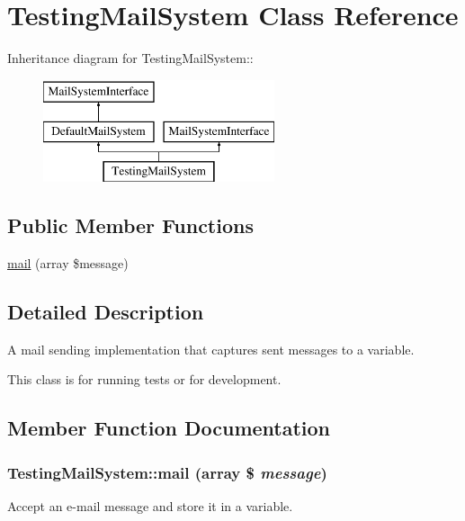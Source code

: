 \hypertarget{classTestingMailSystem}{
\section{TestingMailSystem Class Reference}
\label{classTestingMailSystem}
}
Inheritance diagram for TestingMailSystem::\begin{figure}[H]
\begin{center}
\leavevmode
\includegraphics[height=3cm]{classTestingMailSystem}
\end{center}
\end{figure}
\subsection*{Public Member Functions}
\begin{DoxyCompactItemize}
\item 
\hyperlink{classTestingMailSystem_ae49025dfeb69acaff2df6035a25defbf}{mail} (array \$message)
\end{DoxyCompactItemize}


\subsection{Detailed Description}
A mail sending implementation that captures sent messages to a variable.

This class is for running tests or for development. 

\subsection{Member Function Documentation}
\hypertarget{classTestingMailSystem_ae49025dfeb69acaff2df6035a25defbf}{
\subsubsection[{mail}]{\setlength{\rightskip}{0pt plus 5cm}TestingMailSystem::mail (array \$ {\em message})}}
\label{classTestingMailSystem_ae49025dfeb69acaff2df6035a25defbf}
Accept an e-\/mail message and store it in a variable.


